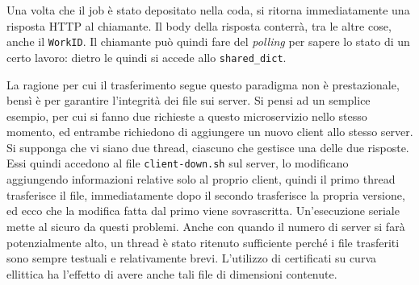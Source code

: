 Una volta che il job è stato depositato nella coda, si ritorna immediatamente una risposta HTTP
al chiamante. Il body della risposta conterrà, tra le altre cose, anche il \texttt{WorkID}.
Il chiamante può quindi fare del \textit{polling} per sapere lo stato di un certo lavoro: dietro
le quindi si accede allo \texttt{shared\_dict}.

La ragione per cui il trasferimento segue questo paradigma non è prestazionale, bensì è per
garantire l'integrità dei file sui server.
Si pensi ad un semplice esempio, per cui si fanno due richieste a questo microservizio nello stesso
momento, ed entrambe richiedono di aggiungere un nuovo client allo stesso server.
Si supponga che vi siano due thread, ciascuno che gestisce una delle due risposte. Essi quindi
accedono al file \texttt{client-down.sh} sul server, lo modificano aggiungendo informazioni
relative solo al proprio client, quindi il primo thread trasferisce il file, immediatamente dopo
il secondo trasferisce la propria versione, ed ecco che la modifica fatta dal primo viene
sovrascritta.
Un'esecuzione seriale mette al sicuro da questi problemi. Anche con quando il numero di server
si farà potenzialmente alto, un thread è stato ritenuto sufficiente perché i file trasferiti
sono sempre testuali e relativamente brevi. L'utilizzo di certificati su curva ellittica
ha l'effetto di avere anche tali file di dimensioni contenute.
